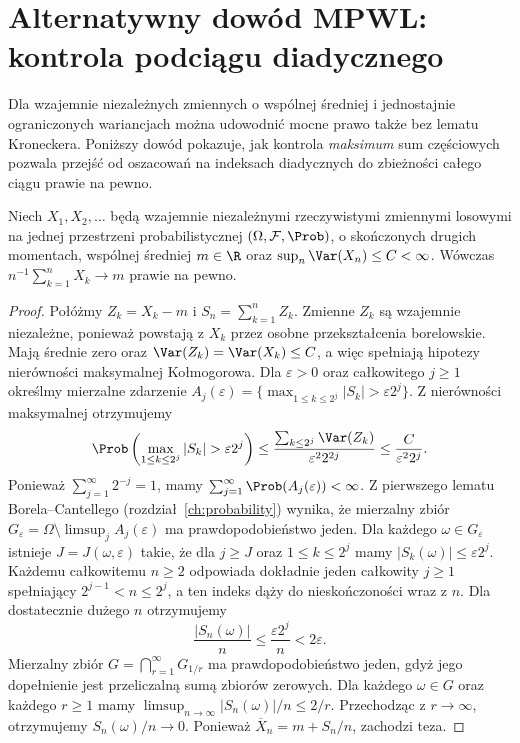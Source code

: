 \section{Alternatywny dowód MPWL: kontrola podciągu diadycznego}

Dla wzajemnie niezależnych zmiennych o wspólnej średniej
i jednostajnie ograniczonych wariancjach można udowodnić
mocne prawo także bez lematu Kroneckera. Poniższy dowód
pokazuje, jak kontrola \emph{maksimum} sum częściowych
pozwala przejść od oszacowań na indeksach diadycznych
do zbieżności całego ciągu prawie na pewno.

\begin{twierdzenie}
Niech $X_1,X_2,\ldots$ będą wzajemnie niezależnymi
rzeczywistymi zmiennymi losowymi na jednej przestrzeni
probabilistycznej $(\Omega,\mathcal F,\Prob)$,
o skończonych drugich momentach, wspólnej średniej
$m\in\R$ oraz $\sup_n\Var(X_n)\leq C<\infty$.
Wówczas $n^{-1}\sum_{k=1}^nX_k\to m$ prawie na pewno.
\end{twierdzenie}
\begin{proof}
Połóżmy $Z_k=X_k-m$ i $S_n=\sum_{k=1}^nZ_k$.
Zmienne $Z_k$ są wzajemnie niezależne, ponieważ
powstają z $X_k$ przez osobne przekształcenia borelowskie.
Mają średnie zero oraz
$\Var(Z_k)=\Var(X_k)\leq C$, a więc spełniają hipotezy
nierówności maksymalnej Kołmogorowa.
Dla $\varepsilon>0$ oraz całkowitego $j\geq1$ określmy
mierzalne zdarzenie
$A_j(\varepsilon)=\{\max_{1\leq k\leq2^j}|S_k|>
\varepsilon2^j\}$.
Z nierówności maksymalnej otrzymujemy
\[
\Prob\left(\max_{1\leq k\leq2^j}|S_k|>
\varepsilon2^j\right)
\leq\frac{\sum_{k\leq2^j}\Var(Z_k)}
{\varepsilon^2 2^{2j}}
\leq\frac{C}{\varepsilon^2 2^j}.
\]
Ponieważ $\sum_{j=1}^\infty2^{-j}=1$, mamy
$\sum_{j=1}^\infty\Prob(A_j(\varepsilon))<\infty$.
Z pierwszego lematu Borela--Cantellego
(rozdział~\ref{ch:probability}) wynika, że mierzalny
zbiór $G_\varepsilon=\Omega\setminus\limsup_j A_j(\varepsilon)$
ma prawdopodobieństwo jeden.
Dla każdego $\omega\in G_\varepsilon$ istnieje
$J=J(\omega,\varepsilon)$ takie, że dla $j\geq J$
oraz $1\leq k\leq 2^j$ mamy $|S_k(\omega)|\leq\varepsilon 2^j$.
Każdemu całkowitemu $n\geq2$ odpowiada dokładnie
jeden całkowity $j\geq1$ spełniający $2^{j-1}<n\leq2^j$,
a ten indeks dąży do nieskończoności wraz z $n$.
Dla dostatecznie dużego $n$ otrzymujemy
\[
\frac{|S_n(\omega)|}{n}
\leq\frac{\varepsilon2^j}{n}<2\varepsilon.
\]
Mierzalny zbiór $G=\bigcap_{r=1}^\infty G_{1/r}$
ma prawdopodobieństwo jeden, gdyż jego dopełnienie
jest przeliczalną sumą zbiorów zerowych.
Dla każdego $\omega\in G$ oraz każdego $r\geq1$
mamy $\limsup_{n\to\infty}|S_n(\omega)|/n\leq2/r$.
Przechodząc z $r\to\infty$, otrzymujemy $S_n(\omega)/n\to0$.
Ponieważ $\overline X_n=m+S_n/n$, zachodzi teza.
\end{proof}

